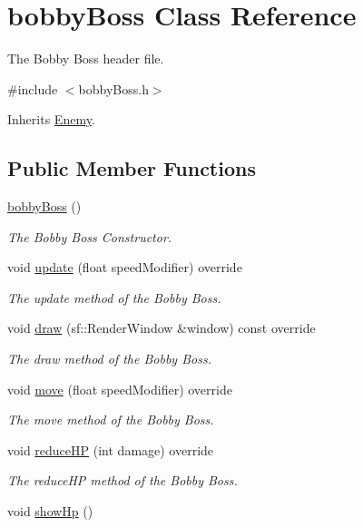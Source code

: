\hypertarget{classbobby_boss}{\section{bobby\+Boss Class Reference}
\label{classbobby_boss}
}


The Bobby Boss header file.  




{\ttfamily \#include $<$bobby\+Boss.\+h$>$}



Inherits \hyperlink{class_enemy}{Enemy}.

\subsection*{Public Member Functions}
\begin{DoxyCompactItemize}
\item 
\hyperlink{classbobby_boss_ad9b35f38432e4b8944e315cceb5035fe}{bobby\+Boss} ()
\begin{DoxyCompactList}\small\item\em The Bobby Boss Constructor. \end{DoxyCompactList}\item 
void \hyperlink{classbobby_boss_a1ba19c55017f2fb3f0b1679d82095d78}{update} (float speed\+Modifier) override
\begin{DoxyCompactList}\small\item\em The update method of the Bobby Boss. \end{DoxyCompactList}\item 
void \hyperlink{classbobby_boss_a168f9c10b7ed7b371518a5d13a145221}{draw} (sf\+::\+Render\+Window \&window) const override
\begin{DoxyCompactList}\small\item\em The draw method of the Bobby Boss. \end{DoxyCompactList}\item 
void \hyperlink{classbobby_boss_aafebea4f0d69a0f84dc1f8af980cf93f}{move} (float speed\+Modifier) override
\begin{DoxyCompactList}\small\item\em The move method of the Bobby Boss. \end{DoxyCompactList}\item 
void \hyperlink{classbobby_boss_aae5b4a01ca776533c8a43a5a91d78af8}{reduce\+H\+P} (int damage) override
\begin{DoxyCompactList}\small\item\em The reduce\+H\+P method of the Bobby Boss. \end{DoxyCompactList}\item 
\hypertarget{classbobby_boss_a63d3d9304aaff572a312e9662c80e226}{void \hyperlink{classbobby_boss_a63d3d9304aaff572a312e9662c80e226}{show\+Hp} ()}\label{classbobby_boss_a63d3d9304aaff572a312e9662c80e226}


\end{DoxyCompactItemize}
